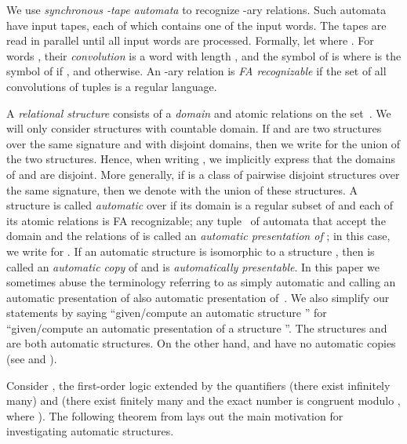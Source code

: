 \documentclass[envcountsame]{llncs}
\begin{document}
We use {\em synchronous -tape automata} to recognize 
-ary relations. Such automata have  input tapes, each of which
contains one of the input words. The  tapes are read in parallel until all input words are processed.
Formally, let  where . For words , their {\em convolution} is a word
 with length , and the  symbol of
 is  where
 is the  symbol of  if , and
 otherwise. An -ary relation  is
\emph{FA recognizable} if the set of all convolutions of tuples
 is a regular
language.

A {\em relational structure}  consists of a {\em domain}  and
atomic relations on the set~. We will only consider structures with
countable domain. If  and  are two structures over the
same signature and with disjoint domains, then we write  for the union of the two structures. Hence, when writing , we implicitly express that the domains of  and
 are disjoint. More generally, if  is a
class of pairwise disjoint structures over the same signature, then we
denote with  the union of these
structures. A structure  is called {\em automatic} over 
if its domain is a regular subset of  and each of its atomic
relations is FA recognizable; any tuple~ of automata that accept
the domain and the relations of  is called an \emph{automatic
  presentation of }; in this case, we write  for . If
an automatic structure  is isomorphic to a structure , then
 is called an {\em automatic copy} of  and  is {\em
  automatically presentable}. In this paper we sometimes abuse the
terminology referring to  as simply automatic and calling an
automatic presentation of  also automatic presentation
of~. We also simplify our statements by saying ``given/compute an
automatic structure '' for ``given/compute an automatic
presentation  of a structure ''. The structures  and  are both automatic structures. On the other hand,
 and  have no automatic copies (see
\cite{KhMi08,Rub08} and \cite{Tsankov}).

Consider , the first-order
logic extended by the quantifiers  (there exist infinitely
many) and  (there exist finitely many and the exact number
is congruent  modulo , where ). The
following theorem from \cite{BluGrae00,Hod82,KhoN95,Rub04}
lays out the main motivation for investigating automatic structures.
\end{document}
